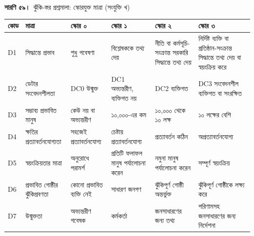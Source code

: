 \documentclass[border=10pt]{standalone}
\begin{document}
\begin{minipage}{22cm}
{\large\bfseries সারণি ৫৯।}\ {\large ঝুঁকি-স্তর প্রশ্নমালা: স্কোরযুক্ত মাত্রা (সংযুক্তি খ)}\par\vspace{7pt}
\small
{}
\begin{tabularx}{\linewidth}{@{}>{\hsize=0.424\hsize\raggedright\arraybackslash}X>{\hsize=1.341\hsize\raggedright\arraybackslash}X>{\hsize=1.059\hsize\raggedright\arraybackslash}X>{\hsize=1.059\hsize\raggedright\arraybackslash}X>{\hsize=1.059\hsize\raggedright\arraybackslash}X>{\hsize=1.059\hsize\raggedright\arraybackslash}X@{}}
\arrayrulecolor{bapilrule}\toprule
\rowcolor{white}\textbf{কোড} & \textbf{মাত্রা} & \textbf{স্কোর ০} & \textbf{স্কোর ১} & \textbf{স্কোর ২} & \textbf{স্কোর ৩} \\
\midrule
D1 & সিদ্ধান্তে প্রভাব & শুধু গবেষণা & বিশ্লেষককে তথ্য দেয় & নীতি বা কর্মসূচি-সংক্রান্ত সরকারি সিদ্ধান্তে তথ্য দেয় & নির্দিষ্ট ব্যক্তি বা প্রতিষ্ঠান-সংক্রান্ত সিদ্ধান্তে তথ্য দেয় বা স্বয়ংক্রিয় করে \\
D2 & ডেটার সংবেদনশীলতা & DC0 উন্মুক্ত & DC1 অভ্যন্তরীণ, ব্যক্তিগত নয় & DC2 ব্যক্তিগত & DC3 সংবেদনশীল ব্যক্তিগত বা সংরক্ষিত \\
D3 & সম্ভাব্য প্রভাবিত মানুষ & কেউ নয় বা অভ্যন্তরীণ & ১০,০০০-এর কম & ১০,০০০ থেকে ১০ লক্ষ & ১০ লক্ষের বেশি \\
D4 & ক্ষতির প্রত্যাবর্তনযোগ্যতা & সহজেই প্রত্যাবর্তনযোগ্য & চেষ্টায় প্রত্যাবর্তনযোগ্য & প্রত্যাবর্তন কঠিন & অপ্রত্যাবর্তনযোগ্য \\
D5 & স্বয়ংক্রিয়তার মাত্রা & অনুরোধে পরামর্শ & প্রতিটি ফলাফল মানুষ পর্যালোচনা করেন & নমুনা মানুষ পর্যালোচনা করেন & সম্পূর্ণ স্বয়ংক্রিয় \\
D6 & প্রভাবিত গোষ্ঠীর ঝুঁকিপ্রবণতা & কোনো প্রভাবিত ব্যক্তি নেই & সাধারণ জনগণ & ঝুঁকিপূর্ণ গোষ্ঠী অন্তর্ভুক্ত & ঝুঁকিপূর্ণ গোষ্ঠীকে লক্ষ্য করে \\
D7 & উন্মুক্ততা & অভ্যন্তরীণ গবেষক & কর্মকর্তা & জনসাধারণের জন্য তথ্য & পরিণামসহ জনসাধারণের জন্য নির্দেশনা \\
\bottomrule
\end{tabularx}
\par\vspace{5pt}{\footnotesize\itshape স্তর-নিয়ম: কোনো নিষিদ্ধ ব্যবহার চিহ্ন থাকলে T0। অন্যথায় মোট স্কোর কমপক্ষে ১৩, বা D1 = ৩, বা D2 = ৩, বা D2 ও D3 উভয়ই কমপক্ষে ২ হলে T3; মোট কমপক্ষে ৬, বা D1 = ২, বা D7 কমপক্ষে ২ হলে T2; অন্যথায় T1। bapil.risk-এ বাস্তবায়িত।}
\par{}
\end{minipage}
\end{document}
